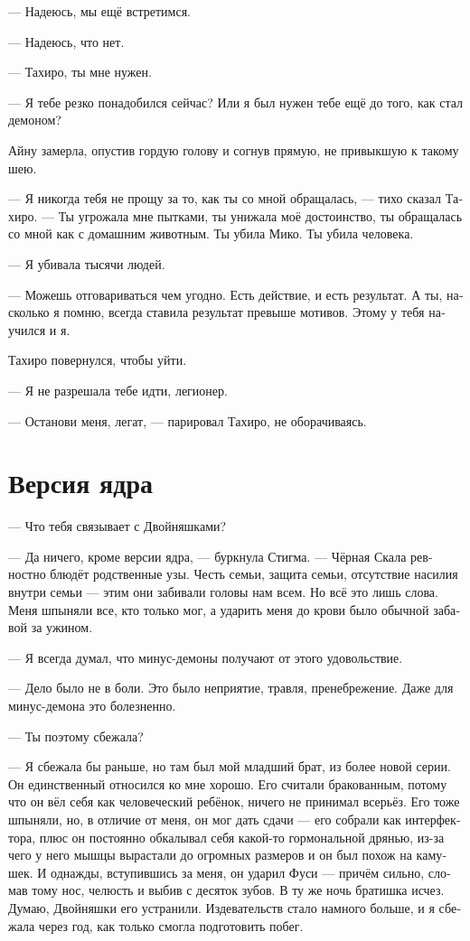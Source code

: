 \documentclass[a4paper,12pt,fleqn]{book}\usepackage{cooltooltips}\usepackage{polyglossia}\setdefaultlanguage[babelshorthands=true]{russian}\setotherlanguage{english}\defaultfontfeatures{Ligatures=TeX,Mapping=tex-text} \usepackage{xcolor}\definecolor{lightgray}{HTML}{bbbbbb}\color{lightgray}\newcommand{\ml}[3]{\textenglish{\textcolor{black}{#3}}}
\newcommand{\asterism}{\vspace{1em}{\centering\Large\bfseries$\ast~\ast~\ast$\par}\vspace{1em}}
\begin{document}
{\asterism

--- Надеюсь, мы ещё встретимся.

--- Надеюсь, что нет.

--- Тахиро, ты мне нужен.

--- Я тебе резко понадобился сейчас?
Или я был нужен тебе ещё до того, как стал демоном?

Айну замерла, опустив гордую голову и согнув прямую, не привыкшую к такому шею.

--- Я никогда тебя не прощу за то, как ты со мной обращалась, --- тихо сказал Тахиро.
--- Ты угрожала мне пытками, ты унижала моё достоинство, ты обращалась со мной как с домашним животным.
Ты убила Мико.
Ты убила человека.

--- Я убивала тысячи людей.

--- Можешь отговариваться чем угодно.
Есть действие, и есть результат.
А ты, насколько я помню, всегда ставила результат превыше мотивов.
Этому у тебя научился и я.

Тахиро повернулся, чтобы уйти.

--- Я не разрешала тебе идти, легионер.

--- Останови меня, легат, --- парировал Тахиро, не оборачиваясь.

\section{Версия ядра}

--- Что тебя связывает с Двойняшками?

--- Да ничего, кроме версии ядра, --- буркнула Стигма.
--- Чёрная Скала ревностно блюдёт родственные узы.
Честь семьи, защита семьи, отсутствие насилия внутри семьи --- этим они забивали головы нам всем.
Но всё это лишь слова.
Меня шпыняли все, кто только мог, а ударить меня до крови было обычной забавой за ужином.

--- Я всегда думал, что минус-демоны получают от этого удовольствие.

--- Дело было не в боли.
Это было неприятие, травля, пренебрежение.
Даже для минус-демона это болезненно.

--- Ты поэтому сбежала?

--- Я сбежала бы раньше, но там был мой младший брат, из более новой серии.
Он единственный относился ко мне хорошо.
Его считали бракованным, потому что он вёл себя как человеческий ребёнок, ничего не принимал всерьёз.
Его тоже шпыняли, но, в отличие от меня, он мог дать сдачи --- его собрали как интерфектора, плюс он постоянно обкалывал себя какой-то гормональной дрянью, из-за чего у него мышцы вырастали до огромных размеров и он был похож на камушек.
И однажды, вступившись за меня, он ударил Фуси --- причём сильно, сломав тому нос, челюсть и выбив с десяток зубов.
В ту же ночь братишка исчез.
Думаю, Двойняшки его устранили.
Издевательств стало намного больше, и я сбежала через год, как только смогла подготовить побег.

}
\end{document}
